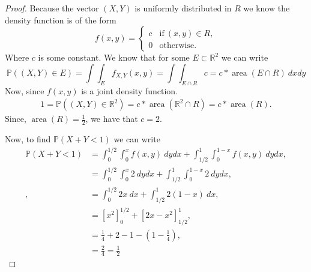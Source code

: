 \documentclass{article}
\newcommand{\R}{\mathbb{R}}
\renewcommand{\P}[1]{\mathbb{P}(#1)}
\DeclareMathOperator{\area}{area}
\begin{document}
\begin{proof}
    Because the vector $(X,Y)$ is uniformly distributed in $R$ we know
    the density function is of the form
    \begin{equation*}
        f(x,y) = \begin{cases}
            c & \text{if} \ (x,y) \in R, \\
            0 & \text{otherwise}.
        \end{cases}
    \end{equation*}
    Where $c$ is some constant. We know that for some $E\subset \R^2$ we can
    write
    \begin{equation*}
        \P{(X,Y) \in E} = \int\int_{E} f_{X,Y}(x,y)
        = \int\int_{E\cap R} c = c*\area(E\cap R)\ dxdy
    \end{equation*}
    Now, since $f(x,y)$ is a joint density function.
    \begin{align*}
        1 = \P{(X,Y) \in \R^2} = c*\area(\R^2 \cap R) = c*\area(R).
    \end{align*}
    Since, $\area(R) = \frac{1}{2}$, we have that $c = 2$.

    Now, to find $\P{X+Y < 1}$ we can write
    \begin{align*}
        \P{X + Y < 1} & = \int_0^{1/2}\int_0^x f(x,y) \ dydx
        + \int_{1/2}^{1}\int_0^{1-x} f(x,y) \ dydx,              \\
                      & = \int_0^{1/2}\int_0^x 2 \ dydx
        +\int_{1/2}^{1}\int_0^{1-x} 2 \ dydx,                    \\ ,
                      & = \int_0^{1/2} 2x \ dx
        + \int_{1/2}^1 2(1-x) \ dx,                              \\
                      & = \left[x^2 \right]_0^{1/2}
        + \left[2x - x^2 \right]_{1/2}^1,                        \\
                      & = \frac{1}{4} + 2 - 1 - (1-\frac{1}{4}), \\
                      & = \frac{2}{4} = \frac{1}{2}
    \end{align*}
\end{proof}
\end{document}
